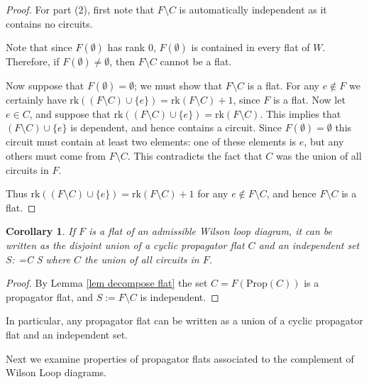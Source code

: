 \documentclass[11pt]{article}
\newcommand{\rk}{\textrm{rk} }
\def\bas #1\eas{\begin{align*} #1 \end{align*}}
\newcommand{\Prop}{\textrm{Prop}}
\newtheorem{cor}[thm]{Corollary}
\theoremstyle{remark}
\theoremstyle{definition}
\begin{document}
\begin{proof}
For part (2), first note that $F \setminus C$ is automatically independent as it contains no circuits.

Note that since $F(\emptyset)$ has rank $0$, $F(\emptyset)$ is contained in every flat of $W$. Therefore, if $F(\emptyset) \neq \emptyset$, then $F\setminus C$ cannot be a flat. 

Now suppose that $F(\emptyset) = \emptyset$; we must show that $F\setminus C$ is a flat. For any $e \not\in F$ we certainly have $\rk((F\setminus C)\cup\{e\}) = \rk(F\setminus C) +1$, since $F$ is a flat. Now let $e \in C$, and suppose that $\rk((F\setminus C)\cup\{e\}) = \rk(F\setminus C)$. This implies that $(F\setminus C)\cup \{e\}$ is dependent, and hence contains a circuit. Since $F(\emptyset) = \emptyset$ this circuit must contain at least two elements: one of these elements is $e$, but any others must come from $F \setminus C$. This contradicts the fact that $C$ was the union of all circuits in $F$. 

Thus $\rk((F\setminus C)\cup \{e\}) = \rk(F\setminus C) + 1$ for any $e \not\in F\setminus C$, and hence $F\setminus C$ is a flat.
\end{proof}

\begin{cor} \label{classifyflats}
  If $F$ is a flat of an admissible Wilson loop diagram, it can be written as the disjoint union of a cyclic propagator flat $C$ and an independent set $S$: \bas F =C \sqcup S \eas where $C$ the union of all circuits in $F$. \end{cor}
 
\begin{proof}
By Lemma \ref{lem decompose flat} the set $C = F(\Prop(C))$ is a propagator flat, and $S := F \setminus C$ is independent.
\end{proof}

In particular, any propagator flat can be written as a union of a cyclic propagator flat and an independent set.

Next we examine properties of propagator flats associated to the complement of Wilson Loop diagrams.

\end{document}
